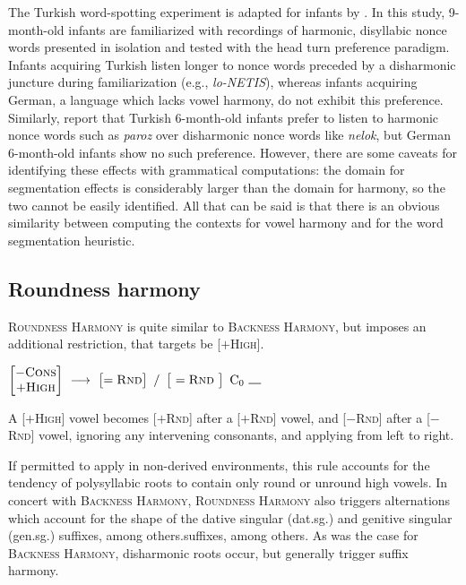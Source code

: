 The Turkish word-spotting experiment is adapted for infants by \citet{Kampen2008}.
In this study, 9-month-old infants are familiarized with recordings of harmonic, disyllabic nonce words presented in isolation and tested with the head turn preference paradigm.
Infants acquiring Turkish listen longer to nonce words preceded by a disharmonic juncture during familiarization (e.g., \emph{lo-NETIS}), whereas infants acquiring German, a language which lacks vowel harmony, do not exhibit this preference. 
Similarly, \citeauthor{Kampen2008} report that Turkish 6-month-old infants prefer to listen to harmonic nonce words such as \emph{paroz} over disharmonic nonce words like \emph{nelok}, but German 6-month-old infants show no such preference.
However, there are some caveats for identifying these effects with grammatical computations: the domain for segmentation effects is considerably larger than the domain for harmony, so the two cannot be easily identified.
All that can be said is that there is an obvious similarity between computing the contexts for vowel harmony and for the word segmentation heuristic.

\subsection{Roundness harmony}

\textsc{Roundness Harmony} is quite similar to \textsc{Backness Harmony}, but imposes an additional restriction, that targets be [$+$\textsc{High}]. 

\begin{example}
$\begin{bmatrix} -\textsc{Cons} \\ +\textsc{High} \end{bmatrix}~\goesto~\begin{bmatrix} =\textsc{Rnd} \end{bmatrix}~/~\begin{bmatrix}~=\textsc{Rnd}~\end{bmatrix}~\textrm{C}_0~\gap$
\end{example}

\noindent
A [$+$\textsc{High}] vowel becomes [$+$\textsc{Rnd}] after a [$+$\textsc{Rnd}] vowel, and [$-$\textsc{Rnd}] after a [$-$\textsc{Rnd}] vowel, ignoring any intervening consonants, and applying from left to right. 

If permitted to apply in non-derived environments, this rule accounts for the tendency of polysyllabic roots to contain only round or unround high vowels.
In concert with \textsc{Backness Harmony}, \textsc{Roundness Harmony} also triggers alternations which account for the shape of the dative singular (dat.sg.) and genitive singular (gen.sg.) suffixes, among others.suffixes, among others.
As was the case for \textsc{Backness Harmony}, disharmonic roots occur, but generally trigger suffix harmony.

